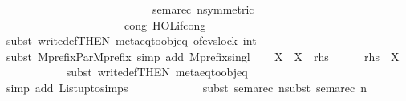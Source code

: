 \begin{isabellebody}
\ \ \ \ \ \ \ \ \ \ \ \ \ \ \ \ \ \ \ \ \ \ \ \ \ \ sema{\isacharunderscore}{\kern0pt}rec{\isacharbrackleft}{\kern0pt}\ n{\isacharequal}{\kern0pt}{\isacartoucheopen}{}{\isacartoucheclose}{\isacharcomma}{\kern0pt}symmetric{\isacharbrackright}{\kern0pt}\isanewline
\ \ \ \ \ \ \ \ \ \ \ \ \ \ \ \ \ \ \ \ \ cong{\isacharcolon}{\kern0pt}\ HOL{\isachardot}{\kern0pt}if{\isacharunderscore}{\kern0pt}cong{\isacharparenright}{\kern0pt}\isanewline
\ \ \ \ \ \ \ \ \ \ \isamarkupfalse%
{\isacharparenleft}{\kern0pt}subst\ write{}{\isacharunderscore}{\kern0pt}def{\isacharbrackleft}{\kern0pt}THEN\ meta{\isacharunderscore}{\kern0pt}eq{\isacharunderscore}{\kern0pt}to{\isacharunderscore}{\kern0pt}obj{\isacharunderscore}{\kern0pt}eq{\isacharcomma}{\kern0pt}\ of{\isachardoublequoteopen}evs{\isachardot}{\kern0pt}lock\ {\isacharparenleft}{\kern0pt}{}{\isacharcolon}{\kern0pt}{\isacharcolon}{\kern0pt}int{\isacharparenright}{\kern0pt}{\isachardoublequoteclose}{\isacharbrackright}{\kern0pt}{\isacharparenright}{\kern0pt}\isanewline
\ \ \ \ \ \ \ \ \ \ \isamarkupfalse%
{\isacharparenleft}{\kern0pt}subst\ Mprefix{\isacharunderscore}{\kern0pt}Par{\isacharunderscore}{\kern0pt}Mprefix{\isacharcomma}{\kern0pt}\ simp\ add{\isacharcolon}{\kern0pt}\ Mprefix{\isacharunderscore}{\kern0pt}singl{\isacharparenright}{\kern0pt}\isanewline
\ \ \isamarkupfalse%
\ X\ \ {\isachardoublequoteopen}X\ {\isacharequal}{\kern0pt}\ {\isacharquery}{\kern0pt}rhs{\isacharprime}{\kern0pt}{\isachardoublequoteclose}\isanewline
\ \ \isamarkupfalse%
\ {\isacharasterisk}{\kern0pt}{\isacharasterisk}{\kern0pt}\ {\isacharcolon}{\kern0pt}\ {\isachardoublequoteopen}{\isacharquery}{\kern0pt}rhs\ {\isacharequal}{\kern0pt}\ X{\isachardoublequoteclose}\ \isanewline
\ \ \ \ \ \ \ \ \ \ \isamarkupfalse%
{\isacharparenleft}{\kern0pt}subst\ write{}{\isacharunderscore}{\kern0pt}def{\isacharbrackleft}{\kern0pt}THEN\ meta{\isacharunderscore}{\kern0pt}eq{\isacharunderscore}{\kern0pt}to{\isacharunderscore}{\kern0pt}obj{\isacharunderscore}{\kern0pt}eq{\isacharbrackright}{\kern0pt}{\isacharparenright}{\kern0pt}\isanewline
\ \ \ \ \ \ \ \ \ \ \isamarkupfalse%
{\isacharparenleft}{\kern0pt}simp\ add{\isacharcolon}{\kern0pt}\ List{\isachardot}{\kern0pt}upto{\isachardot}{\kern0pt}simps{\isacharparenright}{\kern0pt}\ \ \isanewline
\ \ \ \ \ \ \ \ \ \ \isamarkupfalse%
{\isacharparenleft}{\kern0pt}subst\ sema{\isacharunderscore}{\kern0pt}rec{\isacharbrackleft}{\kern0pt}\ n{\isacharequal}{\kern0pt}{\isacartoucheopen}{}{\isacartoucheclose}{\isacharbrackright}{\kern0pt}{\isacharcomma}{\kern0pt}subst\ sema{\isacharunderscore}{\kern0pt}rec{\isacharbrackleft}{\kern0pt}\ n{\isacharequal}{\kern0pt}{\isacartoucheopen}{}{\isacartoucheclose}{\isacharbrackright}{\kern0pt}{\isacharcomma}{\kern0pt}\isanewline

\end{isabellebody}
